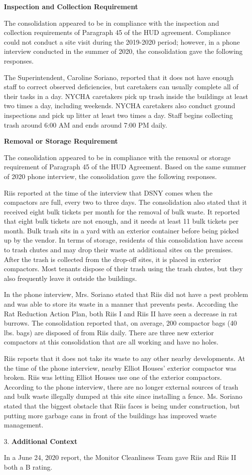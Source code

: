
\textbf{Inspection and Collection Requirement}

The consolidation appeared to be in compliance with the inspection and collection requirements of Paragraph 45 of the HUD agreement. Compliance could not conduct a site visit during the 2019-2020 period; however, in a phone interview conducted in the summer of 2020, the consolidation gave the following responses. 

The Superintendent, Caroline Soriano, reported that it does not have enough staff to correct observed deficiencies, but caretakers can usually complete all of their tasks in a day. NYCHA caretakers pick up trash inside the buildings at least two times a day, including weekends. NYCHA caretakers also conduct ground inspections and pick up litter at least two times a day. Staff begins collecting trash around 6:00 AM and ends around 7:00 PM daily.

\textbf{Removal or Storage Requirement}

The consolidation appeared to be in compliance with the removal or storage requirement of Paragraph  45 of the HUD  Agreement.  Based on the same summer of 2020 phone interview, the consolidation gave the following responses.  

Riis reported at the time of the interview that DSNY comes when the compactors are full, every two to three days. The consolidation also stated that it received eight bulk tickets per month for the removal of bulk waste. It reported that eight bulk tickets are not enough, and it needs at least 11 bulk tickets per month.  Bulk trash sits in a yard with an exterior container before being picked up by the vendor. In terms of storage, residents of this consolidation have access to trash chutes and may drop their waste at additional sites on the premises. After the trash is collected from the drop-off sites, it is placed in exterior compactors. Most tenants dispose of their trash using the trash chutes, but they also frequently leave it outside the buildings.  

In the phone interview, Mrs. Soriano stated that Riis did not have a pest problem and was able to store its waste in a manner that prevents pests. According  the Rat Reduction  Action  Plan, both Riis I and Riis II  have seen a decrease in rat burrows. The consolidation reported that, on average, 200 compactor bags (40 lbs. bags) are disposed of from Riis daily. There are three new exterior compactors at this consolidation that are all working and have no holes. 

Riis reports that it does not take its waste to any other nearby developments. At the time of the phone interview, nearby Elliot Houses' exterior compactor was broken. Riis was letting Elliot Houses use one of the exterior compactors. According to the phone interview, there are no longer external sources of trash and bulk waste illegally dumped at this site since installing a fence. Ms. Soriano stated that the biggest obstacle that Riis faces is being under construction, but putting more garbage cans in front of the buildings has improved waste management.  

3. \textbf{Additional Context}

In a June 24, 2020 report, the Monitor Cleanliness Team gave Riis and Riis II both a B rating. 